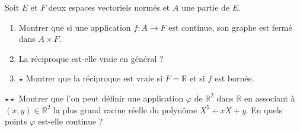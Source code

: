\documentclass[french,a4paper]{article}
\newcommand{\R}{\mathbb{R}}
\theoremstyle{plain}
\theoremstyle{definition}
\theoremstyle{remark}
\begin{document}
\begin{ex}[Moulin.21]{}
	Soit $E$ et $F$ deux espaces vectoriels normés et $A$ une partie de $E$.
	\begin{enumerate}
		\item Montrer que si une application $f:A\to F$ est continue, son graphe est fermé dans $A\times F$.
		\item La réciproque est-elle vraie en général ?
		\item $\star$ Montrer que la réciproque est vraie si $F=\R$ et si $f$ est bornée.
	\end{enumerate}
\end{ex}

\begin{ex}[Moulin.22]{$\star\star$}
	Montrer que l'on peut définir une application $\varphi$ de $\R^2$ dans $\R$ en associant à $(x,y)\in\R^2$ la plus grand racine réelle du polynôme $X^5+xX+y$. En quels points $\varphi$ est-elle continue ?
\end{ex}
\end{document}
